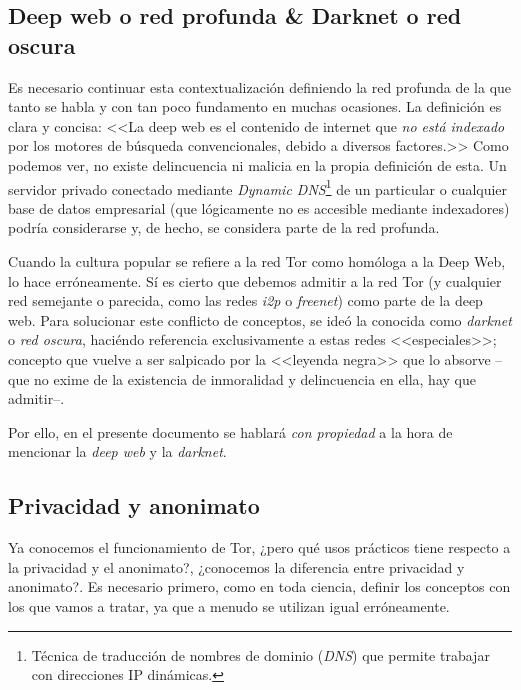 \documentclass[a4paper, 11pt, titlepage]{article}
\begin{document}
    \subsection{Deep web o red profunda \& Darknet o red oscura}

        Es necesario continuar esta contextualización definiendo la red profunda de la que tanto se habla y con tan poco 
        fundamento en muchas ocasiones. La definición es clara y concisa: <<La deep web es el contenido de internet que 
        \emph{no está indexado} por los motores de búsqueda convencionales, debido a diversos factores.>> Como podemos 
        ver, no existe delincuencia ni malicia en la propia definición de esta. Un servidor privado conectado mediante 
        \emph{Dynamic DNS}\footnote{Técnica de traducción de nombres de dominio (\emph{DNS}) que permite trabajar con 
        direcciones IP dinámicas.} de un particular o cualquier base de datos empresarial (que lógicamente no es accesible
        mediante indexadores) podría considerarse y, de hecho, se considera parte de la red profunda.

        Cuando la cultura popular se refiere a la red Tor como homóloga a la Deep Web, lo hace erróneamente. Sí es cierto 
        que debemos admitir a la red Tor (y cualquier red semejante o parecida, como las redes \emph{i2p} o \emph{freenet}) 
        como parte de la deep web. Para solucionar este conflicto de conceptos, se ideó la conocida como \emph{darknet} o 
        \emph{red oscura}, haciéndo referencia exclusivamente a estas redes <<especiales>>; concepto que vuelve a ser 
        salpicado por la <<leyenda negra>> que lo absorve --que no exime de la existencia de inmoralidad y delincuencia 
        en ella, hay que admitir--.

        Por ello, en el presente documento se hablará \emph{con propiedad} a la hora de mencionar la \emph{deep web} y 
        la \emph{darknet}.

    \subsection{Privacidad y anonimato}
            
        Ya conocemos el funcionamiento de Tor, ¿pero qué usos prácticos tiene respecto a la privacidad y el anonimato?, 
        ¿conocemos la diferencia entre privacidad y anonimato?. Es necesario primero, como en toda ciencia, definir los 
        conceptos con los que vamos a tratar, ya que a menudo se utilizan igual erróneamente.
\end{document}
